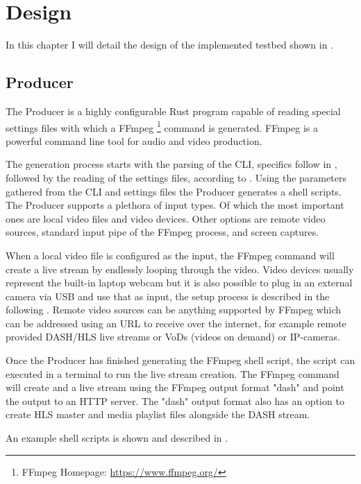\chapter{Design\label{cha:chapter4}}

In this chapter I will detail the design of the implemented testbed shown in . 

\section{Producer\label{sec:producer}}

The Producer is a highly configurable Rust program capable of reading special settings files with which a FFmpeg \footnote{FFmpeg Homepage: \url{https://www.ffmpeg.org/}} command is generated. FFmpeg is a powerful command line tool for audio and video production.

The generation process starts with the parsing of the CLI, specifics follow in , followed by the reading of the settings files, according to . Using the parameters gathered from the CLI and settings files the Producer generates a shell scripts. The Producer supports a plethora of input types. Of which the most important ones are local video files and video devices. Other options are remote video sources, standard input pipe of the FFmpeg process, and screen captures.

When a local video file is configured as the input, the FFmpeg command will create a live stream by endlessly looping through the video. Video devices usually represent the built-in laptop webcam but it is also possible to plug in an external camera via USB and use that as input, the setup process is described in the following . Remote video sources can be anything supported by FFmpeg which can be addressed using an URL to receive over the internet, for example remote provided DASH/HLS live streams or VoDs (videos on demand) or IP-cameras.

Once the Producer has finished generating the FFmpeg shell script, the script can executed in a terminal to run the live stream creation. The FFmpeg command will create and a live stream using the FFmpeg output format "dash" and point the output to an HTTP server. The "dash" output format also has an option to create HLS master and media playlist files alongside the DASH stream. 

An example shell scripts is shown and described in .

